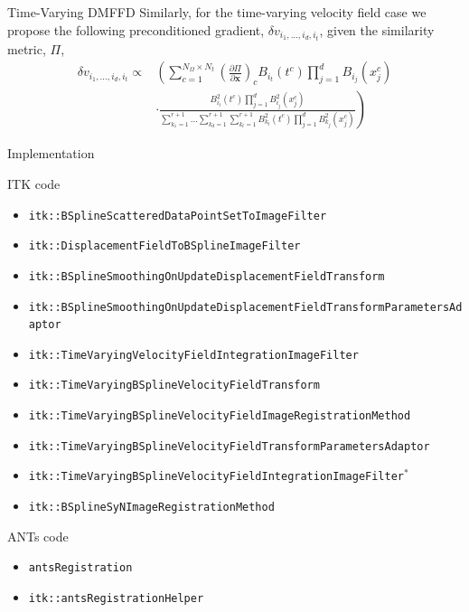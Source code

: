 \documentclass[xcolor=dvipsnames,serif,10pt]{beamer}
\begin{document}
\begin{frame}{Time-Varying DMFFD}
Similarly, for the time-varying velocity field case we propose the following preconditioned gradient,
$\delta v_{i_1,\ldots,i_d,i_t}$, given the similarity metric, $\Pi$,%
\begin{align}
  \delta v_{i_1,\ldots,i_d,i_t} \propto& \left( \sum_{c=1}^{N_{\Omega} \times N_t} \left( \frac{\partial \Pi}{\partial \mathbf{x}} \right)_c B_{i_t}(t^c)\prod_{j=1}^d B_{i_j}(x_j^c)  \right. \nonumber \\
  &\cdot \left. \frac{B_{i_t}^2(t^c) \prod_{j=1}^d B_{i_j}^2 (x_j^c)} 
  {\sum_{k_1=1}^{r+1}\ldots\sum_{k_d=1}^{r+1} \sum_{k_t=1}^{r+1} B_{k_t}^2(t^c) 
  \prod_{j=1}^d B_{k_j}^2 (x_j^c)} \right) \nonumber 
\end{align}

\end{frame}




\begin{frame}{Implementation}

\begin{block}{ITK code}
\begin{itemize}
  \fontsize{8}{9}\selectfont
  \item \texttt{itk::BSplineScatteredDataPointSetToImageFilter}
  \item \texttt{itk::DisplacementFieldToBSplineImageFilter}
  \item \texttt{itk::BSplineSmoothingOnUpdateDisplacementFieldTransform} 
  \item \texttt{itk::BSplineSmoothingOnUpdateDisplacementFieldTransformParametersAdaptor} 
  \item \texttt{itk::TimeVaryingVelocityFieldIntegrationImageFilter} 
  \item \texttt{itk::TimeVaryingBSplineVelocityFieldTransform} 
  \item \texttt{itk::TimeVaryingBSplineVelocityFieldImageRegistrationMethod}
  \item \texttt{itk::TimeVaryingBSplineVelocityFieldTransformParametersAdaptor}
  \item \texttt{itk::TimeVaryingBSplineVelocityFieldIntegrationImageFilter}$^*$ 
  \item \texttt{itk::BSplineSyNImageRegistrationMethod}
\end{itemize}
\end{block}

\begin{block}{ANTs code}
\begin{itemize}
  \fontsize{8}{9}\selectfont
  \item \texttt{antsRegistration} 
  \item \texttt{itk::antsRegistrationHelper} 
\end{itemize}
\end{block}

\end{frame}
\end{document}
